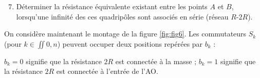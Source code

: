 \documentclass[a4paper,french,bookmarks]{article}
\begin{document}
    \begin{enumerate}
        \setcounter{enumi}{6}
        \item Déterminer la résistance équivalente existant entre les points $A$ et $B$, lorsqu'une infinité des ces quadripôles sont associés en série (réseau $R$-$2R$).
        
    \end{enumerate}
    
    On considère maintenant le montage de la figure \ref{fig:fig6}. Les commutateurs $S_k$ (pour $k \in \iint{0, n}$) peuvent occuper deux positions repérées par $b_k$ :
    \begin{enumerate}
        \itt $b_k = 0$ signifie que la résistance $2R$ est connectée à la masse ;
        \itt $b_k = 1$ signifie que la résistance $2R$ est connectée à l'entrée de l'AO.
    \end{enumerate}
    
\end{document}
